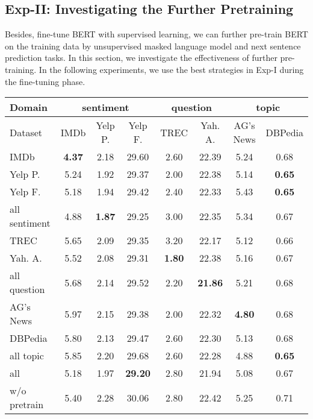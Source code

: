 \documentclass[11pt,a4paper]{article}
\theoremstyle{definition}
\begin{document}
\begin{CJK*}{UTF8}{gbsn}
\subsection{Exp-II: Investigating the Further Pretraining}\label{sec:exp-pretrain}

Besides, fine-tune BERT with supervised learning, we can further pre-train BERT on the training data by unsupervised masked language model and next sentence prediction tasks.
In this section, we investigate the effectiveness of further pre-training. In the following experiments, we use the best strategies in Exp-I during the fine-tuning phase.

\begin{table*}[t!]\small\setlength{\tabcolsep}{10pt}
		\centering
		\begin{tabular}{l |c c c| c c| c c}
			\toprule
            Domain & \multicolumn{3}{c}{sentiment} & \multicolumn{2}{|c}{question} & \multicolumn{2}{|c}{topic}\\
			\midrule
Dataset & IMDb & Yelp P. & Yelp F. & TREC & Yah. A. & AG's News & DBPedia  \\
			\midrule
			IMDb & \textbf{4.37} & 2.18 & 29.60 & 2.60 & 22.39 & 5.24 & 0.68 \\
			Yelp P. & 5.24 & 1.92 & 29.37 & 2.00 & 22.38 & 5.14 & \textbf{0.65} \\
			Yelp F. & 5.18 & 1.94 & 29.42 & 2.40 & 22.33 & 5.43 & \textbf{0.65}\\
			all sentiment & 4.88 & \textbf{1.87} & 29.25 & 3.00 & 22.35 & 5.34 & 0.67 \\
			\midrule
			TREC & 5.65 & 2.09 & 29.35 & 3.20 & 22.17 & 5.12 & 0.66 \\
			Yah. A. & 5.52 & 2.08 & 29.31 & \textbf{1.80} & 22.38 & 5.16 & 0.67 \\
			all question & 5.68 & 2.14 & 29.52 & 2.20 & \textbf{21.86} & 5.21 & 0.68 \\
			\midrule
			AG's News & 5.97 & 2.15 & 29.38 & 2.00 & 22.32 & \textbf{4.80} & 0.68 \\
			DBPedia & 5.80 & 2.13 & 29.47 & 2.60 & 22.30 & 5.13 & 0.68 \\
			all topic & 5.85 & 2.20 & 29.68 & 2.60 & 22.28 & 4.88 & \textbf{0.65} \\
			\midrule
			all & 5.18 & 1.97 & \textbf{29.20} & 2.80 & 21.94 & 5.08 & 0.67 \\
\midrule
w/o pretrain & 5.40 & 2.28 & 30.06 & 2.80 & 22.42 & 5.25 & 0.71\\
			

\end{tabular}
\end{table*}
\end{CJK*}
\end{document}
